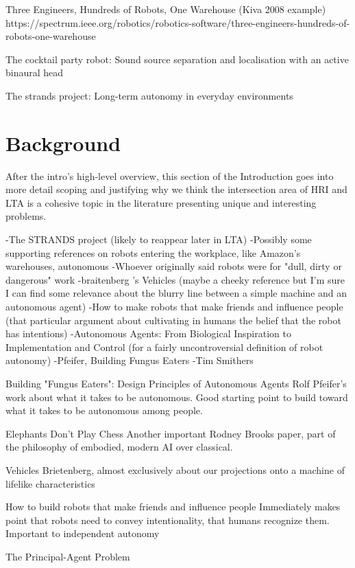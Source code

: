 \documentclass{sfuthesis}
\begin{document}
Three Engineers, Hundreds of Robots, One Warehouse (Kiva 2008 example)
https://spectrum.ieee.org/robotics/robotics-software/three-engineers-hundreds-of-robots-one-warehouse

The cocktail party robot: Sound source separation and localisation with an active binaural head

The strands project: Long-term autonomy in everyday environments

\section{Background}

After the intro's high-level overview, this section of the Introduction goes into more detail scoping and justifying why we think the intersection area of HRI and LTA is a cohesive topic in the literature presenting unique and interesting problems.

-The STRANDS project (likely to reappear later in LTA)
-Possibly some supporting references on robots entering the workplace, like Amazon's warehouses, autonomous 
-Whoever originally said robots were for "dull, dirty or dangerous" work
-braitenberg 's Vehicles (maybe a cheeky reference but I'm sure I can find some relevance about the blurry line between a simple machine and an autonomous agent)
-How to make robots that make friends and influence people (that particular argument about cultivating in humans the belief that the robot has intentions)
-Autonomous Agents: From Biological Inspiration to Implementation and Control (for a fairly uncontroversial definition of robot autonomy)
-Pfeifer, Building Fungus Eaters
-Tim Smithers

Building "Fungus Eaters": Design Principles of Autonomous Agents	Rolf Pfeifer's work about what it takes to be autonomous. Good starting point to build toward what it takes to be autonomous among people.

Elephants Don't Play Chess	Another important Rodney Brooks paper, part of the philosophy of embodied, modern AI over classical.

Vehicles	Brietenberg, almost exclusively about our projections onto a machine of lifelike characteristics

How to build robots that make friends and influence people	Immediately makes point that robots need to convey intentionality, that humans recognize them. Important to independent autonomy

The Principal-Agent Problem
\end{document}
